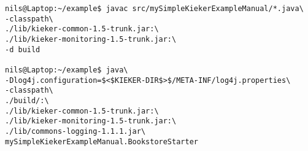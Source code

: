 \begin{lstlisting} 			
nils@Laptop:~/example$ javac src/mySimpleKiekerExampleManual/*.java\
-classpath\ 		
./lib/kieker-common-1.5-trunk.jar:\
./lib/kieker-monitoring-1.5-trunk.jar:\
-d build

nils@Laptop:~/example$ java\
-Dlog4j.configuration=$<$KIEKER-DIR$>$/META-INF/log4j.properties\
-classpath\ 	
./build/:\
./lib/kieker-common-1.5-trunk.jar:\
./lib/kieker-monitoring-1.5-trunk.jar:\
./lib/commons-logging-1.1.1.jar\
mySimpleKiekerExampleManual.BookstoreStarter 
\end{lstlisting}